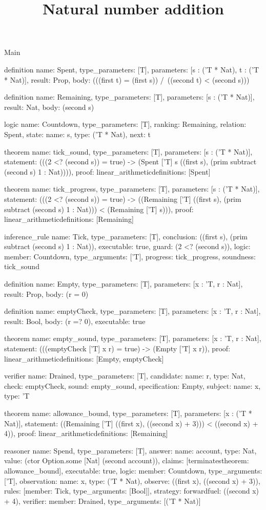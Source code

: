 \begin{lexlean}{Main}
\title{Natural number addition}
\begin{semanticmodule}
definition{
  name: Spent,
  type_parameters: [T],
  parameters: [s : ('T * Nat), t : ('T * Nat)],
  result: Prop,
  body: (((first t) = (first s)) /\ ((second t) < (second s)))
}

definition{
  name: Remaining,
  type_parameters: [T],
  parameters: [s : ('T * Nat)],
  result: Nat,
  body: (second s)
}

logic{
  name: Countdown,
  type_parameters: [T],
  ranking: Remaining,
  relation: Spent,
  state: {name: s, type: ('T * Nat), next: t}
}

theorem{
  name: tick_sound,
  type_parameters: [T],
  parameters: [s : ('T * Nat)],
  statement: (((2 <? (second s)) = true) -> (Spent ['T] s ((first s), (prim subtract (second s) 1 : Nat)))),
  proof: linear_arithmetic{definitions: [Spent]}
}

theorem{
  name: tick_progress,
  type_parameters: [T],
  parameters: [s : ('T * Nat)],
  statement: (((2 <? (second s)) = true) -> ((Remaining ['T] ((first s), (prim subtract (second s) 1 : Nat))) < (Remaining ['T] s))),
  proof: linear_arithmetic{definitions: [Remaining]}
}

inference_rule{
  name: Tick,
  type_parameters: [T],
  conclusion: ((first s), (prim subtract (second s) 1 : Nat)),
  executable: true,
  guard: (2 <? (second s)),
  logic: {member: Countdown, type_arguments: ['T]},
  progress: tick_progress,
  soundness: tick_sound
}

definition{
  name: Empty,
  type_parameters: [T],
  parameters: [x : 'T, r : Nat],
  result: Prop,
  body: (r = 0)
}

definition{
  name: emptyCheck,
  type_parameters: [T],
  parameters: [x : 'T, r : Nat],
  result: Bool,
  body: (r =? 0),
  executable: true
}

theorem{
  name: empty_sound,
  type_parameters: [T],
  parameters: [x : 'T, r : Nat],
  statement: (((emptyCheck ['T] x r) = true) -> (Empty ['T] x r)),
  proof: linear_arithmetic{definitions: [Empty, emptyCheck]}
}

verifier{
  name: Drained,
  type_parameters: [T],
  candidate: {name: r, type: Nat},
  check: emptyCheck,
  sound: empty_sound,
  specification: Empty,
  subject: {name: x, type: 'T}
}

theorem{
  name: allowance_bound,
  type_parameters: [T],
  parameters: [x : ('T * Nat)],
  statement: ((Remaining ['T] ((first x), ((second x) + 3))) < ((second x) + 4)),
  proof: linear_arithmetic{definitions: [Remaining]}
}

reasoner{
  name: Spend,
  type_parameters: [T],
  answer: {name: account, type: Nat, value: (ctor Option.some [Nat] (second account))},
  claims: [terminates{theorem: allowance_bound}],
  executable: true,
  logic: {member: Countdown, type_arguments: ['T]},
  observation: {name: x, type: ('T * Nat)},
  observe: ((first x), ((second x) + 3)),
  rules: [{member: Tick, type_arguments: [Bool]}],
  strategy: forward{fuel: ((second x) + 4)},
  verifier: {member: Drained, type_arguments: [('T * Nat)]}
}
\end{semanticmodule}
\end{lexlean}
